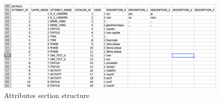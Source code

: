 \documentclass[a4paper, 12pt]{article}
\begin{document}
\begin{figure} [htbp]
  \centering
  \includegraphics[width=.9\textwidth]{img/attributs.png}
  \caption{Attributes section structure}
  \label{fig:attributs}
\end{figure}
\end{document}
